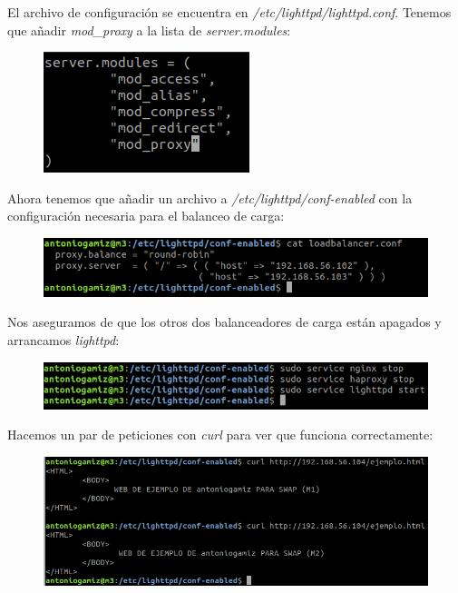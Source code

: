 \documentclass[12pt]{article}
\begin{document}
El archivo de configuración se encuentra en \textit{/etc/lighttpd/lighttpd.conf}. Tenemos que añadir \textit{mod\_proxy} a la lista de \textit{server.modules}:

\begin{figure}[H]
\center
\includegraphics[scale=0.5]{26.png}
\end{figure}

Ahora tenemos que añadir un archivo a \textit{/etc/lighttpd/conf-enabled} con la configuración necesaria para el balanceo de carga:

\begin{figure}[H]
\center
\includegraphics[scale=0.5]{27.png}
\end{figure}

Nos aseguramos de que los otros dos balanceadores de carga están apagados y arrancamos \textit{lighttpd}:

\begin{figure}[H]
\center
\includegraphics[scale=0.5]{28.png}
\end{figure}

Hacemos un par de peticiones con \textit{curl} para ver que funciona correctamente:

\begin{figure}[H]
\center
\includegraphics[scale=0.5]{29.png}
\end{figure}
\end{document}
